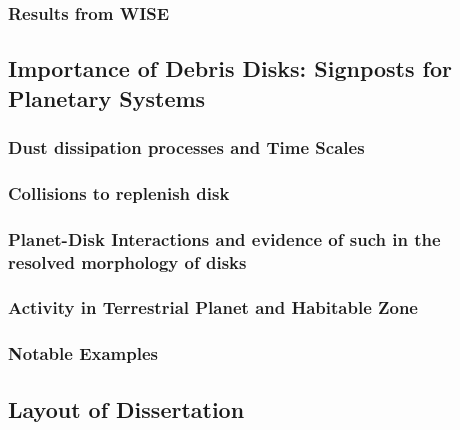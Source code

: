         \subsubsection{Results from WISE}\label{sec:past_wise}
        
        
    \subsection{Importance of Debris Disks: Signposts for Planetary Systems}
        
        \subsubsection{Dust dissipation processes and Time Scales}
        
        \subsubsection{Collisions to replenish disk}
        
        \subsubsection{Planet-Disk Interactions and evidence of such in the resolved morphology of disks}
    
    
        \subsubsection{Activity in Terrestrial Planet and Habitable Zone}
        
        
        \subsubsection{Notable Examples}

    \subsection{Layout of Dissertation}

        